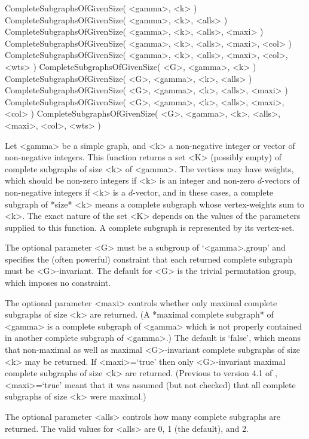 
\>CompleteSubgraphsOfGivenSize( <gamma>, <k> )
\>CompleteSubgraphsOfGivenSize( <gamma>, <k>, <alls> )
\>CompleteSubgraphsOfGivenSize( <gamma>, <k>, <alls>, <maxi> )
\>CompleteSubgraphsOfGivenSize( <gamma>, <k>, <alls>, <maxi>, <col> )
\>CompleteSubgraphsOfGivenSize( <gamma>, <k>, <alls>, <maxi>, <col>, <wts> ) 
\>CompleteSubgraphsOfGivenSize( <G>, <gamma>, <k> )
\>CompleteSubgraphsOfGivenSize( <G>, <gamma>, <k>, <alls> )
\>CompleteSubgraphsOfGivenSize( <G>, <gamma>, <k>, <alls>, <maxi> )
\>CompleteSubgraphsOfGivenSize( <G>, <gamma>, <k>, <alls>, <maxi>, <col> )
\>CompleteSubgraphsOfGivenSize( <G>, <gamma>, <k>, <alls>, <maxi>, <col>, <wts> ) 

Let <gamma> be a simple graph, and <k> a non-negative integer or vector
of non-negative integers.  This function returns a set <K> (possibly
empty) of complete subgraphs of size <k> of <gamma>.  The vertices may
have weights, which should be non-zero integers if <k> is an integer and
non-zero $d$-vectors of non-negative integers if <k> is a $d$-vector,
and in these cases, a complete subgraph of *size* <k> means a complete
subgraph whose vertex-weights sum to <k>.  The exact nature of the set
<K> depends on the values of the parameters supplied to this function. A
complete subgraph is represented by its vertex-set.

The optional parameter <G> must be a subgroup of `<gamma>.group' and
specifies the (often powerful) constraint that each returned complete
subgraph must be <G>-invariant. The default for <G> is the trivial
permutation group, which imposes no constraint.

The optional parameter <maxi> controls whether only maximal complete
subgraphs of size <k> are returned. (A *maximal complete subgraph* of 
<gamma> is a complete subgraph of <gamma> which is not properly contained 
in another complete subgraph of <gamma>.) The default is `false', which 
means that non-maximal as well as maximal <G>-invariant complete subgraphs 
of size <k> may be returned. If <maxi>=`true' then only <G>-invariant maximal
complete subgraphs of size <k> are returned. (Previous to version 4.1
of {\GRAPE}, <maxi>=`true' meant that it was assumed (but not checked)
that all complete subgraphs of size <k> were maximal.)

The optional parameter <alls> controls how many complete subgraphs are
returned. The valid values for <alls> are 0, 1 (the default), and 2.

